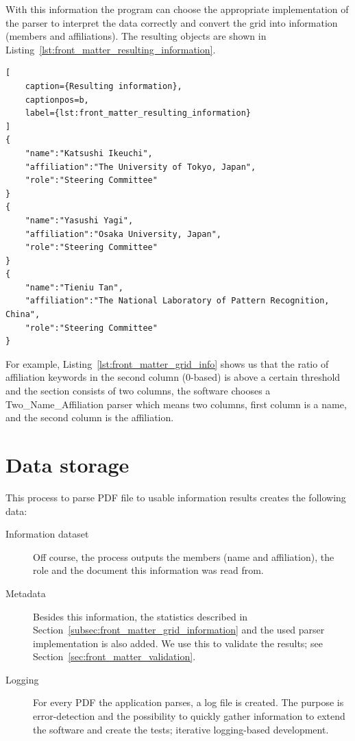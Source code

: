 \documentclass{ou-report}
\begin{document}
With this information the program can choose the appropriate implementation
of the parser to
interpret the data correctly and convert the grid into information (members
and affiliations). The resulting objects are shown in
Listing~\ref{lst:front_matter_resulting_information}.
\begin{lstlisting}[
    caption={Resulting information},
    captionpos=b,
    label={lst:front_matter_resulting_information}
]
{
    "name":"Katsushi Ikeuchi",
    "affiliation":"The University of Tokyo, Japan",
    "role":"Steering Committee"
}
{
    "name":"Yasushi Yagi",
    "affiliation":"Osaka University, Japan",
    "role":"Steering Committee"
}
{
    "name":"Tieniu Tan",
    "affiliation":"The National Laboratory of Pattern Recognition, China",
    "role":"Steering Committee"
}
\end{lstlisting}
For example, Listing~\ref{lst:front_matter_grid_info} shows us that 
the ratio of affiliation keywords in the second column (0-based) is 
above a certain threshold and the section consists of two columns, the software 
chooses a Two\_Name\_Affiliation parser which means two columns, first column is a 
name, and the second column is the affiliation.

\section{Data storage}
This process to parse PDF file to usable information results creates the 
following data:
\begin{description}
    \item[Information dataset] Off course, the process outputs the members (name
        and affiliation), the role and the document this information was read 
        from.
    \item[Metadata] Besides this information, the statistics described in 
        Section~\ref{subsec:front_matter_grid_information} and the used parser 
        implementation is also added. We use this to validate the results; see 
        Section~\ref{sec:front_matter_validation}.
    \item[Logging] For every PDF the application parses, a log file is created.
        The purpose is error-detection and the possibility to quickly gather 
        information to extend the software and create the tests; iterative 
        logging-based development.
\end{description}
\end{document}
